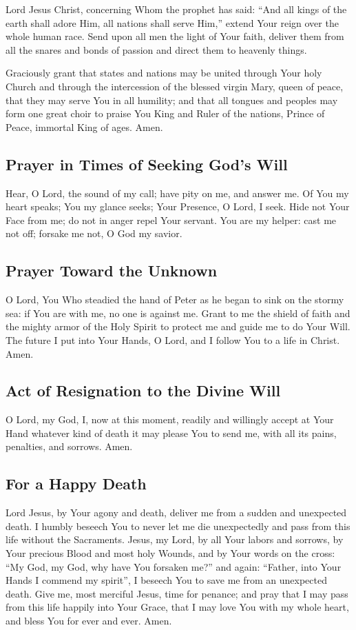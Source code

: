 \documentclass[12pt]{article}
\newcommand{\prayertitle}[1]{\subsection{#1}}
\begin{document}
Lord Jesus Christ, concerning Whom the prophet has said:
``And all kings of the earth shall adore Him, all nations shall serve Him,''
extend Your reign over the whole human race.
Send upon all men the light of Your faith, deliver them from all the snares and bonds of passion and direct them to heavenly things.

Graciously grant that states and nations may be united through Your holy Church and through the intercession of the blessed virgin Mary, queen of peace, that they may serve You in all humility;
and that all tongues and peoples may form one great choir to praise You King and Ruler of the nations, Prince of Peace, immortal King of ages.
Amen.

\prayertitle{Prayer in Times of Seeking God's Will}
Hear, O Lord, the sound of my call;
have pity on me, and answer me.
Of You my heart speaks;
You my glance seeks;
Your Presence, O Lord, I seek.
Hide not Your Face from me; 
do not in anger repel Your servant.
You are my helper: cast me not off;
forsake me not, O God my savior.

\prayertitle{Prayer Toward the Unknown}
O Lord, You Who steadied the hand of Peter as he began to sink on the stormy sea: if You are with me, no one is against me.
Grant to me the shield of faith and the mighty armor of the Holy Spirit to protect me and guide me to do Your Will.
The future I put into Your Hands, O Lord, and I follow You to a life in Christ.
Amen.

\prayertitle{Act of Resignation to the Divine Will}
O Lord, my God, I, now at this moment, readily and willingly accept at Your Hand whatever kind of death it may please You to send me, with all its pains, penalties, and sorrows.
Amen.

\prayertitle{For a Happy Death}
Lord Jesus, by Your agony and death, deliver me from a sudden and unexpected death.
I humbly beseech You to never let me die unexpectedly and pass from this life without the Sacraments.
Jesus, my Lord, by all Your labors and sorrows, by Your precious Blood and most holy Wounds, and by Your words on the cross:
``My God, my God, why have You forsaken me?''
and again:
``Father, into Your Hands I commend my spirit'',
I beseech You to save me from an unexpected death.
Give me, most merciful Jesus, time for penance;
and pray that I may pass from this life happily into Your Grace, that I may love You with my whole heart, and bless You for ever and ever.
Amen.
\end{document}
